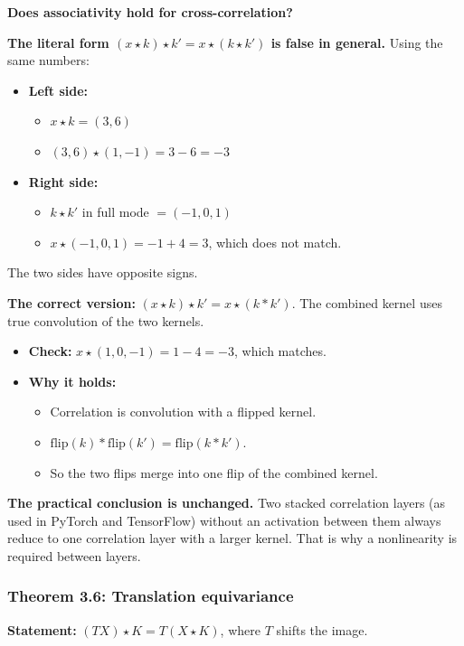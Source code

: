 \textbf{Does associativity hold for cross-correlation?}

\textbf{The literal form $(x \star k) \star k' = x \star (k \star k')$ is false in general.} Using the same numbers:
\begin{itemize}
  \item \textbf{Left side:}
  \begin{itemize}
    \item $x \star k = (3, 6)$
    \item $(3, 6) \star (1, -1) = 3 - 6 = -3$
  \end{itemize}
  \item \textbf{Right side:}
  \begin{itemize}
    \item $k \star k'$ in full mode $= (-1, 0, 1)$
    \item $x \star (-1, 0, 1) = -1 + 4 = 3$, which does not match.
  \end{itemize}
\end{itemize}
The two sides have opposite signs.

\textbf{The correct version:} $(x \star k) \star k' = x \star (k * k')$. The combined kernel uses true convolution of the two kernels.
\begin{itemize}
  \item \textbf{Check:} $x \star (1, 0, -1) = 1 - 4 = -3$, which matches.
  \item \textbf{Why it holds:}
  \begin{itemize}
    \item Correlation is convolution with a flipped kernel.
    \item $\mathrm{flip}(k) * \mathrm{flip}(k') = \mathrm{flip}(k * k')$.
    \item So the two flips merge into one flip of the combined kernel.
  \end{itemize}
\end{itemize}
\textbf{The practical conclusion is unchanged.} Two stacked correlation layers (as used in PyTorch and TensorFlow) without an activation between them always reduce to one correlation layer with a larger kernel. That is why a nonlinearity is required between layers.

\subsubsection*{Theorem 3.6: Translation equivariance}

\textbf{Statement:} $(T X) \star K = T (X \star K)$, where $T$ shifts the image.

